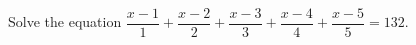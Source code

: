 Solve the equation $\dfrac{x-1}{1}+\dfrac{x-2}{2}+\dfrac{x-3}{3}+\dfrac{x-4}{4}+\dfrac{x-5}{5}=132$.
